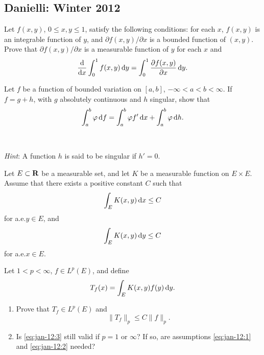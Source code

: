 \setcounter{exercise}{0}
\setcounter{equation}{0}
\subsection{Danielli: Winter 2012}
\begin{problem}
Let $f(x,y)$, $0\leq x,y\leq 1$, satisfy the following conditions: for each
$x$, $f(x,y)$ is an integrable function of $y$, and $\partial
f(x,y)/\partial x$ is a bounded function of $(x,y)$. Prove that $\partial
f(x,y)/\partial x$ is a measurable function of $y$ for each $x$ and
\[
\frac{\mathrm{d}}{\mathrm{d} x}\int_0^1f(x,y)\mathop{}\!\mathrm{d} y=
\int_0^1\frac{\partial f(x,y)}{\partial x}\mathop{}\!\mathrm{d} y.
\]
\end{problem}
\begin{solution}
\end{solution}

\begin{problem}
Let $f$ be a function of bounded variation on $[a,b]$,
$-\infty<a<b<\infty$. If $f=g+h$, with $g$ absolutely continuous and $h$
singular, show that
\[
\int_a^b\varphi\mathop{}\!\mathrm{d} f=\int_a^b\varphi f'\mathop{}\!\mathrm{d} x+\int_a^b\varphi\mathop{}\!\mathrm{d} h.
\]
\\\\
\emph{Hint}: A function $h$ is said to be singular if $h'=0$.
\end{problem}
\begin{solution}
\end{solution}

\begin{problem}
Let $E\subset\mathbf{R}$ be a measurable set, and let $K$ be a measurable
function on $E\times E$. Assume that there exists a positive constant $C$
such that
\begin{equation}
\label{eq:jan-12:1}
\int_E K(x,y)\mathop{}\!\mathrm{d} x\leq C
\end{equation}
for a.e.\@ $y\in E$, and
\begin{equation}
\label{eq:jan-12:2}
\int_E K(x,y)\mathop{}\!\mathrm{d} y\leq C
\end{equation}
for a.e.\@ $x\in E$.

Let $1<p<\infty$, $f\in L^p(E)$, and define
\[
T_f(x)=\int_E K(x,y)f(y)\mathop{}\!\mathrm{d} y.
\]
\begin{enumerate}[label=(\alph*),noitemsep]
\item Prove that $T_f\in L^p(E)$ and
\begin{equation}
\label{eq:jan-12:3}
\|T_f\|_p\leq C\|f\|_p.
\end{equation}
\item Is \eqref{eq:jan-12:3} still valid if $p=1$ or $\infty$? If so, are
  assumptions \eqref{eq:jan-12:1} and \eqref{eq:jan-12:2} needed?
\end{enumerate}
\end{problem}
\begin{solution}
\end{solution}

